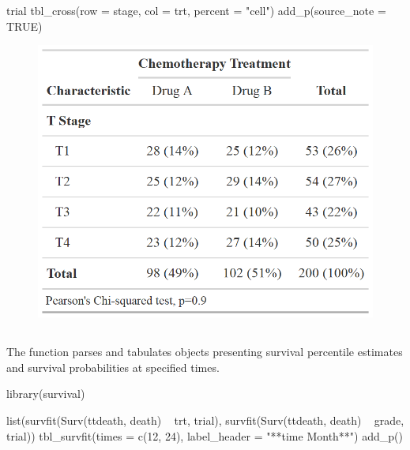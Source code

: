\newpage
\begin{example}
trial %
  tbl_cross(row = stage, col = trt, percent = "cell") %
  add_p(source_note = TRUE)
\end{example}
\begin{figure}[h!]
  \includegraphics[scale=0.35]{cross.png}
  \centering
\end{figure}

\subsection{\texorpdfstring{}{tbl\_survfit()}}

The  function parses and tabulates  objects presenting survival percentile estimates and survival probabilities at specified times. 

\newpage
\begin{example}
library(survival)

list(survfit(Surv(ttdeath, death) ~ trt, trial),
     survfit(Surv(ttdeath, death) ~ grade, trial)) %
  tbl_survfit(times = c(12, 24),
              label_header = "**{time} Month**") %
  add_p()
\end{example}

